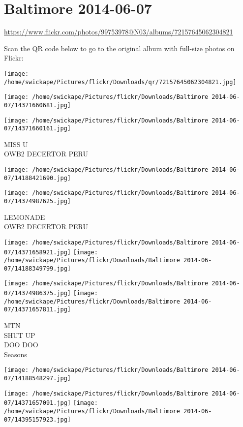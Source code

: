 \documentclass[10pt,letterpaper]{article}
\title{}
\author{}
\date{}
\begin{document}
\section*{Baltimore 2014-06-07}

\url{https://www.flickr.com/photos/99753978@N03/albums/72157645062304821}

Scan the QR code below to go to the original album with full-size photos on Flickr:

\texttt{[image: /home/swickape/Pictures/flickr/Downloads/qr/72157645062304821.jpg]}
\pagebreak

\texttt{[image: /home/swickape/Pictures/flickr/Downloads/Baltimore 2014-06-07/14371660681.jpg]}

\vspace{0.25in}
\texttt{[image: /home/swickape/Pictures/flickr/Downloads/Baltimore 2014-06-07/14371660161.jpg]}

MISS U\\
OWB2 DECERTOR PERU
\pagebreak

\texttt{[image: /home/swickape/Pictures/flickr/Downloads/Baltimore 2014-06-07/14188421690.jpg]}

\vspace{0.25in}
\texttt{[image: /home/swickape/Pictures/flickr/Downloads/Baltimore 2014-06-07/14374987625.jpg]}

LEMONADE\\
OWB2 DECERTOR PERU
\pagebreak

\texttt{[image: /home/swickape/Pictures/flickr/Downloads/Baltimore 2014-06-07/14371658921.jpg]}
\texttt{[image: /home/swickape/Pictures/flickr/Downloads/Baltimore 2014-06-07/14188349799.jpg]}

\texttt{[image: /home/swickape/Pictures/flickr/Downloads/Baltimore 2014-06-07/14374986375.jpg]}
\texttt{[image: /home/swickape/Pictures/flickr/Downloads/Baltimore 2014-06-07/14371657811.jpg]}

MTN\\
SHUT UP\\
DOO DOO\\
Seasons
\pagebreak

\texttt{[image: /home/swickape/Pictures/flickr/Downloads/Baltimore 2014-06-07/14188548297.jpg]}

\vspace{0.25in}
\texttt{[image: /home/swickape/Pictures/flickr/Downloads/Baltimore 2014-06-07/14371657091.jpg]}
\texttt{[image: /home/swickape/Pictures/flickr/Downloads/Baltimore 2014-06-07/14395157923.jpg]}
\end{document}
